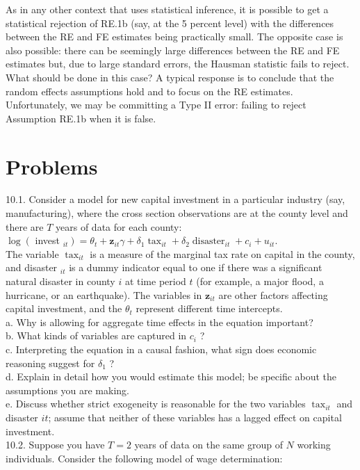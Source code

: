 \documentclass[10pt]{article}
\begin{document}
As in any other context that uses statistical inference, it is possible to get a statistical rejection of RE.1b (say, at the 5 percent level) with the differences between the RE and FE estimates being practically small. The opposite case is also possible: there can be seemingly large differences between the RE and FE estimates but, due to large standard errors, the Hausman statistic fails to reject. What should be done in this case? A typical response is to conclude that the random effects assumptions hold and to focus on the RE estimates. Unfortunately, we may be committing a Type II error: failing to reject Assumption RE.1b when it is false.

\section*{Problems}
10.1. Consider a model for new capital investment in a particular industry (say, manufacturing), where the cross section observations are at the county level and there are $T$ years of data for each county:\\
$\log \left(\right.$ invest $\left._{i t}\right)=\theta_{t}+\mathbf{z}_{i t} \gamma+\delta_{1} \operatorname{tax}_{i t}+\delta_{2} \operatorname{disaster}_{i t}+c_{i}+u_{i t}$.\\
The variable $\operatorname{tax}_{i t}$ is a measure of the marginal tax rate on capital in the county, and disaster $_{i t}$ is a dummy indicator equal to one if there was a significant natural disaster in county $i$ at time period $t$ (for example, a major flood, a hurricane, or an earthquake). The variables in $\mathbf{z}_{i t}$ are other factors affecting capital investment, and the $\theta_{t}$ represent different time intercepts.\\
a. Why is allowing for aggregate time effects in the equation important?\\
b. What kinds of variables are captured in $c_{i}$ ?\\
c. Interpreting the equation in a causal fashion, what sign does economic reasoning suggest for $\delta_{1}$ ?\\
d. Explain in detail how you would estimate this model; be specific about the assumptions you are making.\\
e. Discuss whether strict exogeneity is reasonable for the two variables $\operatorname{tax}_{i t}$ and disaster $i t$; assume that neither of these variables has a lagged effect on capital investment.\\
10.2. Suppose you have $T=2$ years of data on the same group of $N$ working individuals. Consider the following model of wage determination:\\
\end{document}
